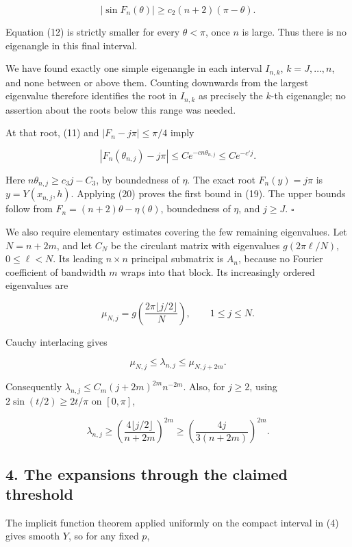 \documentclass[10pt,a4paper]{article}
\begin{document}
\nopagebreak[3]
\[
|\sin F_n(\theta)|\ge c_2(n+2)(\pi-\theta).
\]

Equation (12) is strictly smaller for every \(\theta<\pi\), once \(n\) is large. Thus there is no eigenangle in this final interval.

We have found exactly one simple eigenangle in each interval \(I_{n,k}\), \(k=J,\ldots,n\), and none between or above them. Counting downwards from the largest eigenvalue therefore identifies the root in \(I_{n,k}\) as precisely the \(k\)-th eigenangle; no assertion about the roots below this range was needed.

At that root, (11) and \(|F_n-j\pi|\le\pi/4\) imply

\nopagebreak[3]
\[
|F_n(\theta_{n,j})-j\pi|\le C e^{-cn\theta_{n,j}}\le C e^{-c'j}.
\]

Here \(n\theta_{n,j}\ge c_3j-C_3\), by boundedness of \(\eta\). The exact root \(F_n(y)=j\pi\) is \(y=Y(x_{n,j},h)\). Applying (20) proves the first bound in (19). The upper bounds follow from \(F_n=(n+2)\theta-\eta(\theta)\), boundedness of \(\eta\), and \(j\ge J\). \(\square\)

We also require elementary estimates covering the few remaining eigenvalues. Let \(N=n+2m\), and let \(C_N\) be the circulant matrix with eigenvalues \(g(2\pi\ell/N)\), \(0\le\ell<N\). Its leading \(n\times n\) principal submatrix is \(A_n\), because no Fourier coefficient of bandwidth \(m\) wraps into that block. Its increasingly ordered eigenvalues are

\nopagebreak[3]
\[
\mu_{N,j}=g\left(\frac{2\pi\lfloor j/2\rfloor}{N}\right),\qquad 1\le j\le N.
\]

Cauchy interlacing gives

\nopagebreak[3]
\[
\mu_{N,j}\le\lambda_{n,j}\le\mu_{N,j+2m}.
\tag{21}
\]

Consequently \(\lambda_{n,j}\le C_m(j+2m)^{2m}n^{-2m}\). Also, for \(j\ge2\), using \(2\sin(t/2)\ge2t/\pi\) on \([0,\pi]\),

\nopagebreak[3]
\[
\lambda_{n,j}\ge\left(\frac{4\lfloor j/2\rfloor}{n+2m}\right)^{2m}
\ge\left(\frac{4j}{3(n+2m)}\right)^{2m}.
\tag{22}
\]

\subsection{4. The expansions through the claimed threshold}\label{the-expansions-through-the-claimed-threshold}

The implicit function theorem applied uniformly on the compact interval in (4) gives smooth \(Y\), so for any fixed \(p\),
\end{document}
